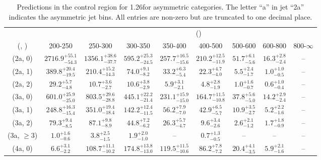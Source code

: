 \begin{table}[h!]
\tiny
\centering
\caption{Predictions in the \mj control region for 1.26\ifb for asymmetric categories. The letter ``a'' in jet \eg ``2a''  indicates the asymmetric jet bins. All entries are non-zero but are truncated to one decimal place.\label{tab:predsep_mu_ewk_asym}}
\begin{tabular}
{ccccccccc}
	\hline\hline
&	& \multicolumn{8}{c}{\scalht (\gev)} \\ 
	 (\njet,  \nb) & 200-250 & 250-300 & 300-350 & 350-400 & 400-500 & 500-600 & 600-800 & 800-$\infty$ \\ [0.8ex] 
\hline
	(2a, 0) & $2716.9^{+ 55.1 }_{- 54.3 }$ & $1356.1^{+ 38.6 }_{- 37.7 }$ & $595.2^{+ 25.3 }_{- 24.5 }$ & $257.7^{+ 16.5 }_{- 15.6 }$ & $210.2^{+ 12.5 }_{- 11.9 }$ & $51.7^{+ 6.1 }_{- 5.6 }$ & $16.3^{+ 2.8 }_{- 2.4 }$ & -- \\[0.5ex] 
	(2a, 1) & $389.8^{+ 20.4 }_{- 19.5 }$ & $210.4^{+ 15.2 }_{- 14.3 }$ & $74.0^{+ 9.1 }_{- 8.2 }$ & $33.2^{+ 6.3 }_{- 5.4 }$ & $22.3^{+ 4.7 }_{- 4.0 }$ & $5.5^{+ 2.4 }_{- 1.7 }$ & $1.0^{+ 1.0 }_{- 0.5 }$ & -- \\[0.5ex] 
	(2a, 2) & $29.2^{+ 5.7 }_{- 4.8 }$ & $10.7^{+ 3.6 }_{- 2.7 }$ & $10.6^{+ 3.8 }_{- 2.9 }$ & $5.9^{+ 3.1 }_{- 2.1 }$ & $4.8^{+ 2.8 }_{- 1.9 }$ & $1.0^{+ 1.6 }_{- 0.7 }$ & $0.6^{+ 1.0 }_{- 0.4 }$ & -- \\[0.5ex] 
	(3a, 0) & $601.0^{+ 25.9 }_{- 25.0 }$ & $803.5^{+ 29.6 }_{- 28.8 }$ & $445.1^{+ 22.2 }_{- 21.4 }$ & $231.1^{+ 15.9 }_{- 15.0 }$ & $164.7^{+ 11.5 }_{- 10.8 }$ & $37.8^{+ 5.6 }_{- 5.0 }$ & $14.2^{+ 2.9 }_{- 2.4 }$ & -- \\[0.5ex] 
	(3a, 1) & $248.8^{+ 16.3 }_{- 15.4 }$ & $351.0^{+ 19.4 }_{- 18.4 }$ & $142.2^{+ 12.4 }_{- 11.5 }$ & $56.2^{+ 7.9 }_{- 7.0 }$ & $42.9^{+ 6.5 }_{- 5.7 }$ & $10.9^{+ 3.5 }_{- 2.7 }$ & $5.2^{+ 2.2 }_{- 1.6 }$ & -- \\[0.5ex] 
	(3a, 2) & $79.3^{+ 9.4 }_{- 8.5 }$ & $87.1^{+ 9.8 }_{- 8.9 }$ & $44.8^{+ 7.2 }_{- 6.2 }$ & $26.3^{+ 5.7 }_{- 4.7 }$ & $9.6^{+ 3.4 }_{- 2.6 }$ & $2.6^{+ 2.1 }_{- 1.2 }$ & $1.7^{+ 1.8 }_{- 0.9 }$ & -- \\[0.5ex] 
	(3a, $\ge3$) & $1.0^{+ 1.6 }_{- 0.6 }$ & $3.8^{+ 2.5 }_{- 1.5 }$ & $1.9^{+ 2.0 }_{- 1.0 }$ & -- & $0.7^{+ 1.3 }_{- 0.5 }$ & -- & -- & -- \\[0.5ex] 
	(4a, 0) & $6.6^{+ 3.1 }_{- 2.2 }$ & $108.7^{+ 11.1 }_{- 10.2 }$ & $174.8^{+ 13.8 }_{- 13.0 }$ & $119.5^{+ 11.5 }_{- 10.6 }$ & $86.2^{+ 7.8 }_{- 7.2 }$ & $20.4^{+ 4.1 }_{- 3.5 }$ & $5.9^{+ 2.1 }_{- 1.6 }$ & -- \\[0.5ex] 

\end{tabular}
\end{table}
